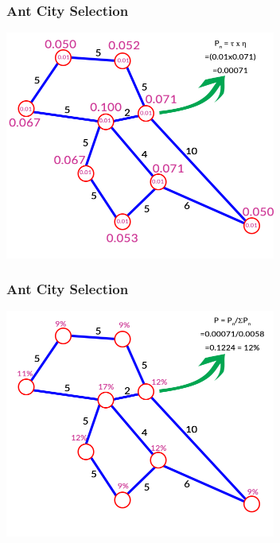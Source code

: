 \documentclass[12pt]{beamer}
\begin{document}
\begin{frame}
\frametitle{Ant City Selection}
\begin{center}
\includegraphics[height=75mm]{Images/pheromone5}\\
\end{center}
\end{frame}
\begin{frame}
\frametitle{Ant City Selection}
\begin{center}
\includegraphics[height=75mm]{Images/pheromone6}\\
\end{center}
\end{frame}
\end{document}

